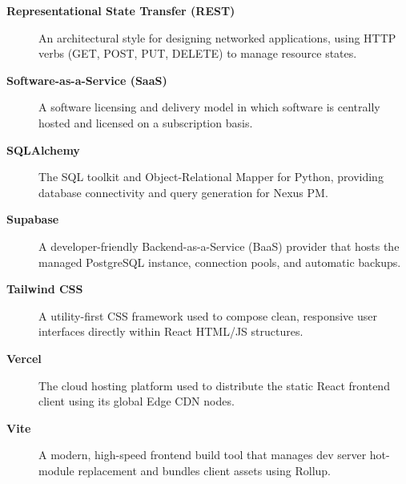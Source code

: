 \begin{description}
    \item[\textbf{Representational State Transfer (REST)}] An architectural style for designing networked applications, using HTTP verbs (GET, POST, PUT, DELETE) to manage resource states.
    \item[\textbf{Software-as-a-Service (SaaS)}] A software licensing and delivery model in which software is centrally hosted and licensed on a subscription basis.
    \item[\textbf{SQLAlchemy}] The SQL toolkit and Object-Relational Mapper for Python, providing database connectivity and query generation for Nexus PM.
    \item[\textbf{Supabase}] A developer-friendly Backend-as-a-Service (BaaS) provider that hosts the managed PostgreSQL instance, connection pools, and automatic backups.
    \item[\textbf{Tailwind CSS}] A utility-first CSS framework used to compose clean, responsive user interfaces directly within React HTML/JS structures.
    \item[\textbf{Vercel}] The cloud hosting platform used to distribute the static React frontend client using its global Edge CDN nodes.
    \item[\textbf{Vite}] A modern, high-speed frontend build tool that manages dev server hot-module replacement and bundles client assets using Rollup.
\end{description}

